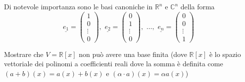 \begin{example}
    Di notevole importanza sono le basi canoniche in $\mathbb{R}^n$ e $\mathbb{C}^n$ della forma
    $$
        \underline{e_1} = \begin{pmatrix} 1 \\ 0 \\ \vdots \\ 0 \end{pmatrix}, \, \, \underline{e_2} = \begin{pmatrix} 0 \\ 1 \\ \vdots \\ 0 \end{pmatrix}, \, \, \ldots, \, \, \underline{e_n} = \begin{pmatrix} 0 \\ 0 \\ \vdots \\ 1 \end{pmatrix}
    $$
\end{example}
\begin{exercise}
    Mostrare che $V = \mathbb{R}[x]$ non può avere una base finita (dove $\mathbb{R}[x]$ è lo spazio vettoriale dei polinomi a coefficienti reali dove la somma è definita come $(a+b)(x) = a(x) + b(x)$ e $(\alpha \cdot a)(x) = \alpha a(x)$)  
    \label{ex:1.4}
\end{exercise}

